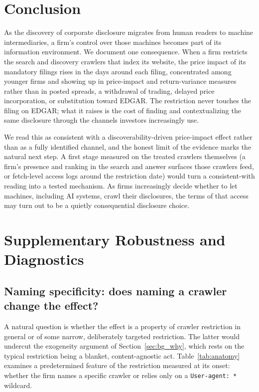 \documentclass[12pt]{article}
\begin{document}


\section{Conclusion}\label{sec:concl}
As the discovery of corporate disclosure migrates from human readers to machine intermediaries, a firm's control over those machines becomes part of its information environment. We document one consequence. When a firm restricts the search and discovery crawlers that index its website, the price impact of its mandatory filings rises in the days around each filing, concentrated among younger firms and showing up in price-impact and return-variance measures rather than in posted spreads, a withdrawal of trading, delayed price incorporation, or substitution toward EDGAR. The restriction never touches the filing on EDGAR; what it raises is the cost of finding and contextualizing the same disclosure through the channels investors increasingly use.

We read this as consistent with a discoverability-driven price-impact effect rather than as a fully identified channel, and the honest limit of the evidence marks the natural next step. A first stage measured on the treated crawlers themselves (a firm's presence and ranking in the search and answer surfaces those crawlers feed, or fetch-level access logs around the restriction date) would turn a consistent-with reading into a tested mechanism. As firms increasingly decide whether to let machines, including AI systems, crawl their disclosures, the terms of that access may turn out to be a quietly consequential disclosure choice.

\appendix
\section{Supplementary Robustness and Diagnostics}\label{sec:appendix}

\subsection{Naming specificity: does naming a crawler change the effect?}\label{app:anatomy}
A natural question is whether the effect is a property of crawler restriction in general or of some narrow, deliberately targeted restriction. The latter would undercut the exogeneity argument of Section~\ref{sec:bg_why}, which rests on the typical restriction being a blanket, content-agnostic act. Table~\ref{tab:anatomy} examines a predetermined feature of the restriction measured at its onset: whether the firm names a specific crawler or relies only on a \texttt{User-agent: *} wildcard.
\end{document}

